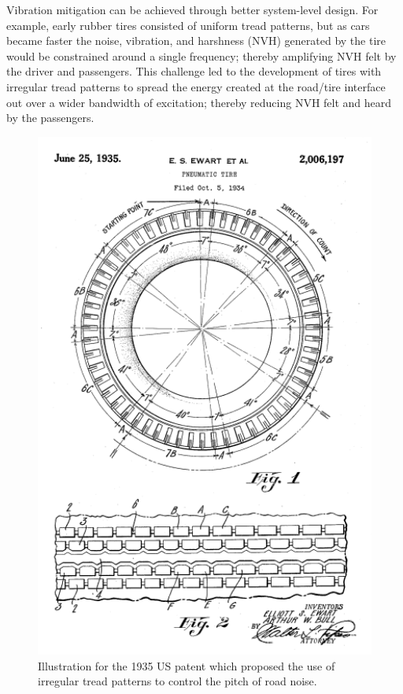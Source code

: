 \documentclass[12pt,letter]{article}
\begin{document}
		\begin{vibration_case_study}
	Vibration mitigation can be achieved through better system-level design. For example, early rubber tires consisted of uniform tread patterns, but as cars became faster the noise, vibration, and harshness (NVH) generated by the tire would be constrained around a single frequency; thereby amplifying NVH felt by the driver and passengers. This challenge led to the development of tires with irregular tread patterns to spread the energy created at the road/tire interface out over a wider bandwidth of excitation; thereby reducing NVH felt and heard by the passengers.   
	
	
	\begin{figure}[H]
		\centering
		\includegraphics[width=4.5in]{../figures/tire_tred_patent.png}
		\caption{Illustration for the 1935 US patent which proposed the use of irregular tread patterns to control the pitch of road noise\protect\footnotemark[1].}
	\end{figure}	
\end{vibration_case_study}
\end{document}
